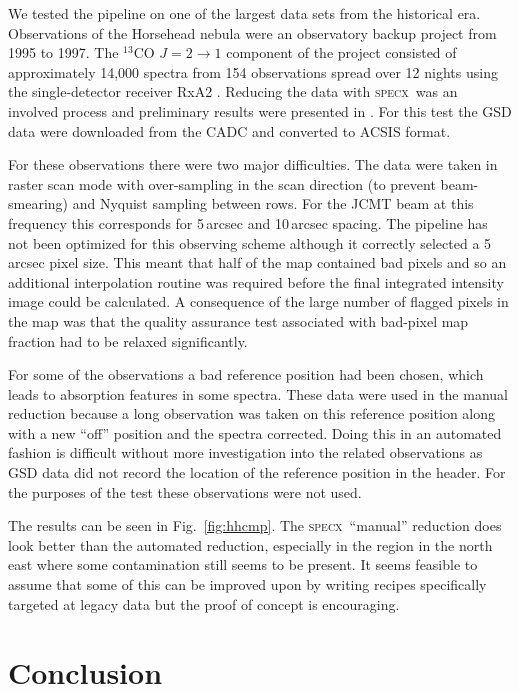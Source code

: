 \documentclass[useAMS,usenatbib]{mn2e}
\newcommand{\specx}{\textsc{specx}}
\begin{document}
We tested the pipeline on one of the largest data sets from the
historical era. Observations of the Horsehead nebula were an
observatory backup project from 1995 to 1997. The $^{13}$CO
$J=2\rightarrow 1$ component of the project consisted of approximately
14,000 spectra from 154 observations spread over 12 nights using the
single-detector receiver RxA2 \citep{1992IJIMW..13..647D}. Reducing
the data with \specx\ was an involved process and preliminary results
were presented in \citet{2001AAS...19915601S}. For this test the GSD data were
downloaded from the CADC and converted to ACSIS format.

For these observations there were two major difficulties. The data
were taken in raster scan mode with over-sampling in the scan
direction (to prevent beam-smearing) and Nyquist sampling between
rows. For the JCMT beam at this frequency this corresponds for
5\,arcsec and 10\,arcsec spacing. The pipeline has not been optimized
for this observing scheme although it correctly selected a 5\,arcsec
pixel size. This meant that half of the map contained bad pixels and
so an additional interpolation routine was required before the final
integrated intensity image could be calculated. A consequence of the
large number of flagged pixels in the map was that the quality
assurance test associated with bad-pixel map fraction had to be
relaxed significantly.

For some of the observations a bad reference position had been chosen,
which leads to absorption features in some spectra. These data were
used in the manual reduction because a long observation was taken on
this reference position along with a new ``off'' position and the
spectra corrected. Doing this in an automated fashion is difficult
without more investigation into the related observations as GSD data
did not record the location of the reference position in the
header. For the purposes of the test these observations were not used.

The results can be seen in Fig.\ \ref{fig:hhcmp}. The \specx\ ``manual''
reduction does look better than the automated reduction, especially in
the region in the north east where some contamination still seems to
be present. It seems feasible to assume that some of this can be
improved upon by writing recipes specifically targeted at legacy data
but the proof of concept is encouraging.

\section{Conclusion}
\end{document}
